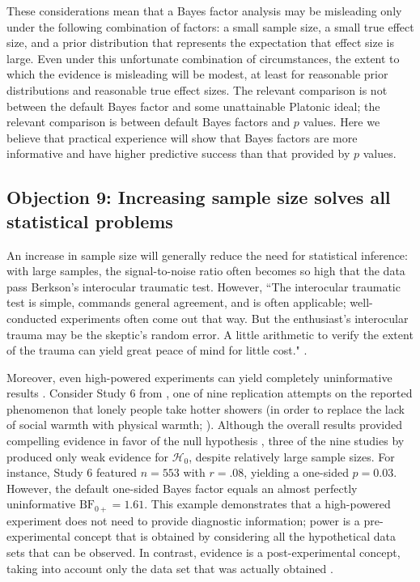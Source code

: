 These considerations mean that a Bayes factor analysis may be misleading only under the following combination of factors: a small sample size, a small true effect size, and a prior distribution that represents the expectation that effect size is large. Even under this unfortunate combination of circumstances, the extent to which the evidence is misleading will be modest, at least for reasonable prior distributions and reasonable true effect sizes. The relevant comparison is not between the default Bayes factor and some unattainable Platonic ideal; the relevant comparison is between default Bayes factors and $p$ values. Here we believe that practical experience will show that Bayes factors are more informative and have higher predictive success than that provided by $p$ values.

\subsection{Objection 9: Increasing sample size solves all statistical problems}
An increase in sample size will generally reduce the need for statistical inference: with large samples, the signal-to-noise ratio often becomes so high that the data pass Berkson's interocular traumatic test. However, ``The interocular traumatic test is simple, commands general agreement, and is often applicable; well-conducted experiments often come out that way. But the enthusiast's interocular trauma may be the skeptic's random error. A little arithmetic to verify the extent of the trauma can yield great peace of mind for little cost." \cite[p. 217]{EdwardsEtAl1963}.

Moreover, even high-powered experiments can yield completely uninformative results \cite{WagenmakersEtAl2016Bathing}. Consider Study 6 from , one of nine replication attempts on the reported phenomenon that lonely people take hotter showers (in order to replace the lack of social warmth with physical warmth; ). Although the overall results provided compelling evidence in favor of the null hypothesis \cite{WagenmakersEtAl2016Bathing}, three of the nine studies by  produced only weak evidence for $\mathcal{H}_0$, despite relatively large sample sizes. For instance, Study 6 featured $n=553$ with $r=.08$, yielding a one-sided $p = 0.03$. However, the default one-sided Bayes factor equals an almost perfectly uninformative $\text{BF}_{0+} = 1.61$. This example demonstrates that a high-powered experiment does not need to provide diagnostic information; power is a pre-experimental concept that is obtained by considering all the hypothetical data sets that can be observed. In contrast, evidence is a post-experimental concept, taking into account only the data set that was actually obtained \cite{WagenmakersEtAlPowerFallacy2015}.

